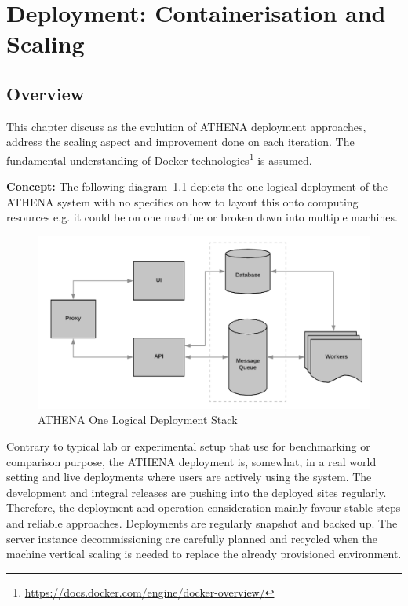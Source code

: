 \chapter{Deployment: Containerisation and Scaling}

\label{Chapter3}

\section{Overview}
This chapter discuss as the evolution of ATHENA deployment approaches, address the scaling aspect and improvement done on each iteration. The fundamental understanding of Docker technologies\footnote{\url{https://docs.docker.com/engine/docker-overview/}} is assumed.

\noindent \textbf{Concept:} \quad The following diagram~\ref{fig:deployStack} depicts the one logical deployment of the ATHENA system with no specifics on how to layout this onto computing resources e.g. it could be on one machine or broken down into multiple machines.

\begin{figure}[H]
\centering
\includegraphics[width=0.5\paperwidth]{Figures/ATHENA_deploy_stack}
\decoRule
\caption[ATHENA Deployment Stack]{ATHENA One Logical Deployment Stack}
\label{fig:deployStack}
\end{figure}

Contrary to typical lab or experimental setup that use for benchmarking or comparison purpose, the ATHENA deployment is, somewhat, in a real world setting and live deployments where users are actively using the system. The development and integral releases are pushing into the deployed sites regularly. Therefore, the deployment and operation consideration mainly favour stable steps and reliable approaches. Deployments are regularly snapshot and backed up. The server instance decommissioning are carefully planned and recycled when the machine vertical scaling is needed to replace the already provisioned environment. 

